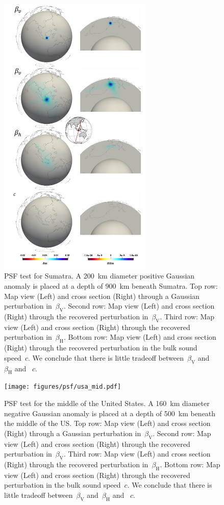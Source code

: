 \documentclass[extra,mreferee]{gji}
\begin{document}
\begin{figure}
  \centering
  \includegraphics[width=0.65\textwidth]{figures/psf/su.pdf}
  \caption{\small{PSF test for Sumatra.
    A 200~km diameter positive Gaussian anomaly is placed at a depth of 900~km beneath Sumatra.
  Top row: Map view (Left) and cross section (Right) through a Gaussian perturbation in~$\beta_\mathrm{V}$.
  Second row: Map view (Left) and cross section (Right) through the recovered perturbation in~$\beta_\mathrm{V}$.
  Third row: Map view (Left) and cross section (Right) through the recovered perturbation in~$\beta_\mathrm{H}$.
  Bottom row: Map view (Left) and cross section (Right) through the recovered perturbation in the bulk sound speed~$c$. We conclude that there is little tradeoff between~$\beta_\mathrm{V}$ and~$\beta_\mathrm{H}$ and ~$c$.
  }}
  \label{fig:psf_su}
\end{figure}

\begin{figure}
  \centering
  \texttt{[image: figures/psf/usa\_mid.pdf]}
  \caption{\small{PSF test for the middle of the United States.
    A 160~km diameter negative Gaussian anomaly is placed at a depth of 500~km beneath the middle of the US.
  Top row: Map view (Left) and cross section (Right) through a Gaussian perturbation in~$\beta_\mathrm{V}$.
  Second row: Map view (Left) and cross section (Right) through the recovered perturbation in~$\beta_\mathrm{V}$.
  Third row: Map view (Left) and cross section (Right) through the recovered perturbation in~$\beta_\mathrm{H}$.
  Bottom row: Map view (Left) and cross section (Right) through the recovered perturbation in the bulk sound speed~$c$. We conclude that there is little tradeoff between~$\beta_\mathrm{V}$ and~$\beta_\mathrm{H}$ and ~$c$.
  }}
  \label{fig:psf_usa_mid}
\end{figure}
\end{document}
